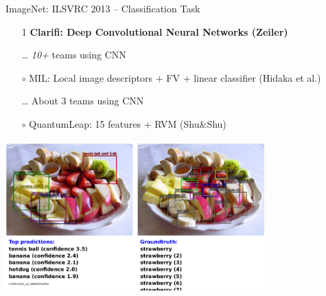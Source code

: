 \documentclass{beamer}
\begin{document}
\begin{frame}{ImageNet: ILSVRC 2013 -- Classification Task}

    {\small
    \begin{enumerate}
        \item[1] {\bf Clarifi: Deep Convolutional Neural Networks
            {\scriptsize (Zeiler)}}
        \item[\dots] \emph{10+} teams using CNN
        \item[$\circ$] MIL: Local image descriptors + FV + linear
            classifier {\small (Hidaka et al.)}
        \item[\dots] About 3 teams using CNN
        \item[$\circ$] QuantumLeap: 15 features + RVM {\small
            (Shu\&Shu)}
    \end{enumerate}
    }

    \centering
    \includegraphics[width=0.75\textwidth]{overfeat.png}

    \vspace{-7mm}

\end{frame}
\end{document}

